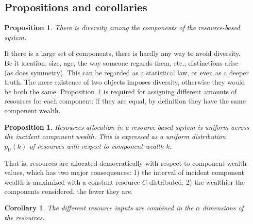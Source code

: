 \documentclass[10pt,letterpaper]{article}
\newtheorem{proposition}[theorem]{Proposition}
\newtheorem{corollary}[theorem2]{Corollary}
\begin{document}
\subsection{Propositions and corollaries}\label{propCol}
\setcounter{theorem}{-1}
\begin{proposition}\label{prop:0}
	There is diversity among the components of the resource-based system.
\end{proposition}

If there is a large set of components, there is hardly any way to avoid diversity. Be it location, size, age, the way someone regards them, etc., distinctions arise (as does symmetry). This can be regarded as a statistical law, or even as a deeper truth.
The mere existence of two objects imposes diversity, otherwise they would be both the same. Proposition~\ref{prop:0} is required for assigning different amounts of resources for each component: if they are equal, by definition they have the same component wealth.

\begin{proposition}\label{prop:2}
	Resources allocation in a resource-based system is uniform across the incident component wealth. This is expressed as a uniform distribution $p_U(k)$ of resources with respect to component wealth $k$.
\end{proposition}

That is, resources are allocated democratically with respect to component wealth values, which has two major consequences: 1) the interval of incident component wealth is maximized with a constant resource $C$ distributed; 
2) the wealthier the components considered, the fewer they are. 

\begin{corollary}\label{prop:1}
	The different resource inputs are combined in the $\alpha$ dimensions of the resources.
\end{corollary}

\end{document}
